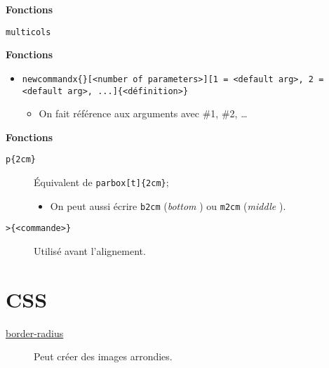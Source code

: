 \documentclass[10pt, french]{article}
\begin{document}
\begin{multicols*}{2}
\begin{algo2}[amsmath]
\end{algo2}

\begin{algo2}[amsymb]
\end{algo2}

\begin{algo2}[multicol]
\textbf{Fonctions}
\begin{description}
	\item	\texttt{multicols}
\end{description}
\end{algo2}

\begin{algo2}[xcolor]
\end{algo2}

\begin{algo2}[tikz]
\end{algo2}

\begin{algo2}[tcolorbox]
\end{algo2}

\begin{algo2}[xargs]
\textbf{Fonctions}
\begin{itemize}[leftmargin = *]
	\item	\texttt{newcommandx\{<nom de la commande>\}[<number of parameters>][1 = <default arg>, 2 = <default arg>, ...]\{<définition>\}}
		\begin{itemize}[leftmargin = *]
		\item	On fait référence aux arguments avec \#1, \#2, \dots
		\end{itemize}
\end{itemize}
\end{algo2}

\begin{algo2}[array]
\textbf{Fonctions}
\begin{description}
	\item[\texttt{p\{2cm\}}]	Équivalent de \texttt{parbox[t]\{2cm\}};
		\begin{itemize}
		\item	On peut aussi écrire \texttt{b{2cm}} (\og \textit{bottom} \fg{}) ou \texttt{m{2cm}} (\og \textit{middle} \fg{}).
		\end{itemize}
	\item[\texttt{>\{<commande>\}}]	Utilisé avant l'alignement.
\end{description}
\end{algo2}


\newpage

\section{CSS}

\begin{algo2}[images]
\begin{description}
    \item[\href{https://www.w3schools.com/css/css3_images.asp}{border-radius}]  Peut créer des images arrondies.
\end{description}
\end{algo2}

\end{multicols*}
\end{document}
